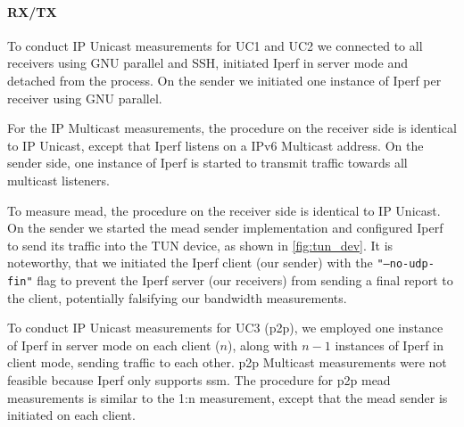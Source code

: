 \paragraph{RX/TX} %
\label{par:RX/TX}
To conduct IP Unicast measurements for UC1 and UC2 we connected to all
    receivers using GNU parallel and SSH, initiated Iperf in server mode and
    detached from the process.
On the sender we initiated one instance of Iperf per receiver using GNU
    parallel.

For the IP Multicast measurements, the procedure on the receiver side is
    identical to IP Unicast, except that Iperf listens on a IPv6 Multicast
    address.
On the sender side, one instance of Iperf is started to transmit traffic
    towards all multicast listeners.

To measure \gls{mead}, the procedure on the receiver side is identical to IP
    Unicast.
On the sender we started the \gls{mead} sender implementation and configured
    Iperf to send its traffic into the TUN device, as shown in
    \autoref{fig:tun_dev}.
It is noteworthy, that we initiated the Iperf client (our sender) with the
    \texttt{"--no-udp-fin"} flag to prevent the Iperf server (our receivers)
    from sending a final report to the client, potentially falsifying our
    bandwidth measurements.

To conduct IP Unicast measurements for UC3 (\gls{p2p}), we employed one
    instance of Iperf in server mode on each client ($n$), along with $n-1$
    instances of Iperf in client mode, sending traffic to each other.
\gls{p2p} Multicast measurements were not feasible because Iperf only supports
    \gls{ssm}.
The procedure for \gls{p2p} \gls{mead} measurements is similar to the 1:n
    measurement, except that the \gls{mead} sender is initiated on each client.


